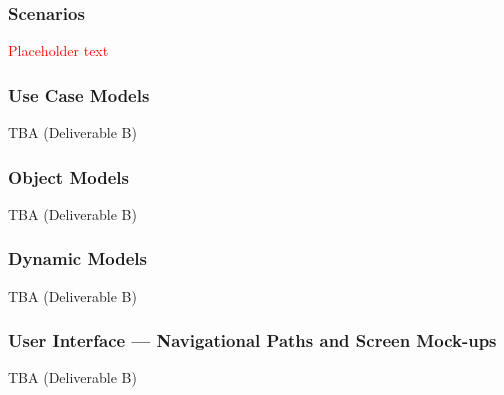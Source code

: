 \documentclass[a4paper, 11pt, titlepage]{article}
\begin{document}
\subsubsection{Scenarios}
\textcolor{red}{Placeholder text}

\subsubsection{Use Case Models}
TBA (Deliverable B)

\subsubsection{Object Models}
TBA (Deliverable B)

\subsubsection{Dynamic Models}
TBA (Deliverable B)

\subsubsection{User Interface --- Navigational Paths and Screen Mock-ups}
TBA (Deliverable B)


%
%

%
\end{document}
